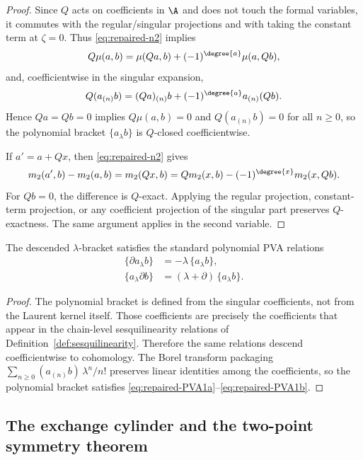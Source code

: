 \begin{proof}
Since $Q$ acts on coefficients in $\A$ and does not touch the formal variables,
it commutes with the regular/singular projections and with taking the constant
term at $\zeta=0$. Thus \eqref{eq:repaired-n2} implies
\[
Q\mu(a,b)=\mu(Qa,b)+(-1)^{\degree{a}}\mu(a,Qb),
\]
and, coefficientwise in the singular expansion,
\[
Q(a_{(n)}b)=(Qa)_{(n)}b+(-1)^{\degree{a}}a_{(n)}(Qb).
\]
Hence $Qa=Qb=0$ implies $Q\mu(a,b)=0$ and $Q(a_{(n)}b)=0$ for all $n\ge0$, so the
polynomial bracket $\{a_\lambda b\}$ is $Q$-closed coefficientwise.

If $a'=a+Qx$, then \eqref{eq:repaired-n2} gives
\[
m_2(a',b)-m_2(a,b)
=
m_2(Qx,b)
=
Qm_2(x,b)-(-1)^{\degree{x}}m_2(x,Qb).
\]
For $Qb=0$, the difference is $Q$-exact. Applying the regular projection, constant-term
projection, or any coefficient projection of the singular part preserves $Q$-exactness.
The same argument applies in the second variable.
\end{proof}

\begin{proposition}
\label{prop:PVA1_proof}
The descended $\lambda$-bracket satisfies the standard polynomial PVA relations
\begin{align}
\label{eq:repaired-PVA1a}
\{\partial a_\lambda b\} &= -\lambda\,\{a_\lambda b\},\\
\label{eq:repaired-PVA1b}
\{a_\lambda \partial b\} &= (\lambda+\partial)\,\{a_\lambda b\}.
\end{align}
\end{proposition}

\begin{proof}
The polynomial bracket is defined from the singular coefficients, not
from the Laurent kernel itself. Those coefficients are precisely the coefficients that
appear in the chain-level sesquilinearity relations of
Definition~\ref{def:sesquilinearity}. Therefore the same relations descend coefficientwise
to cohomology. The Borel transform packaging
$\sum_{n\ge0}(a_{(n)}b)\,\lambda^n/n!$ preserves linear identities among the coefficients,
so the polynomial bracket satisfies \eqref{eq:repaired-PVA1a}--\eqref{eq:repaired-PVA1b}.
\end{proof}

\subsection{The exchange cylinder and the two-point symmetry theorem}

